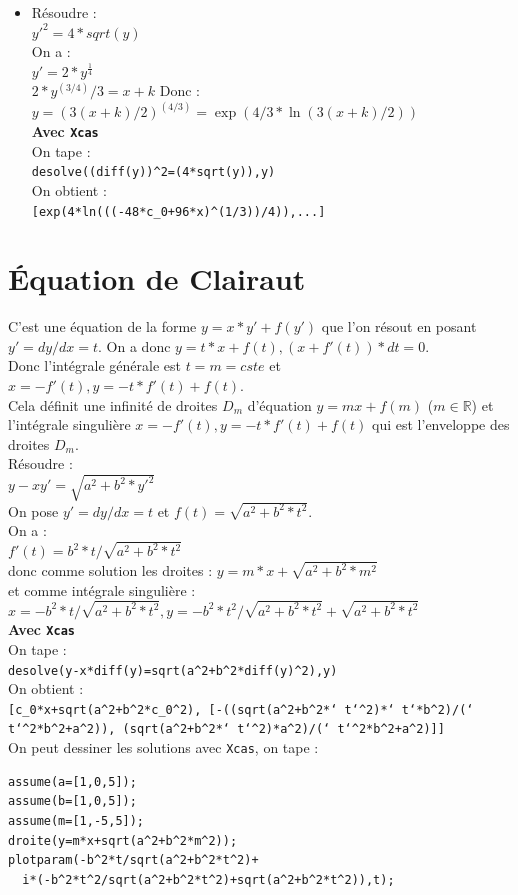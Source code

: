 \documentclass[a4paper,11pt]{book}
\begin{document}
\begin{itemize}
\item R\'esoudre :\\
$y'^2=4*sqrt(y)$\\
On a :\\
$y'=2*y^{\frac{1}{4}}$\\
$2*y^{(3/4)}/3=x+k$
Donc :\\
$y=(3(x+k)/2)^{(4/3)}=\exp(4/3*\ln(3(x+k)/2))$\\
{\bf Avec {\tt Xcas}}\\
On tape :\\
{\tt desolve((diff(y))\verb|^|2=(4*sqrt(y)),y)}\\
On obtient :\\
{\tt [exp(4*ln(((-48*c\_0+96*x)\verb|^|(1/3))/4)),...]}
\end{itemize}

\section{\'Equation de Clairaut} \label{sec:Clairaut}
C'est une \'equation de la forme $y=x*y'+f(y')$ que l'on r\'esout en posant 
$y'=dy/dx=t$. On a donc $y=t*x+f(t),(x+f'(t))*dt=0$.\\
Donc l'int\'egrale g\'en\'erale est $t=m=cste$ et $x=-f'(t),y=-t*f'(t)+f(t)$.\\
Cela  d\'efinit une infinit\'e de droites  $D_m$ d'\'equation $y=mx+f(m)$ 
($m\in \mathbb{R}$) et l'int\'egrale singuli\`ere $x=-f'(t),y=-t*f'(t)+f(t)$
qui est l'enveloppe des droites $D_m$.\\
R\'esoudre :\\
$y-xy'=\sqrt{a^2+b^2*y'^2}$\\
On pose $y'=dy/dx=t$ et $f(t)=\sqrt{a^2+b^2*t^2}$.\\
On a :\\ 
$f'(t)=b^2*t/\sqrt{a^2+b^2*t^2}$ \\
donc comme solution les droites :
$y=m*x+\sqrt{a^2+b^2*m^2}$\\
et comme int\'egrale singuli\`ere :\\
$x=-b^2*t/\sqrt{a^2+b^2*t^2},y=-b^2*t^2/\sqrt{a^2+b^2*t^2}+\sqrt{a^2+b^2*t^2}$\\
{\bf Avec {\tt Xcas}}\\
On tape :\\
{\tt desolve(y-x*diff(y)=sqrt(a\verb|^|2+b\verb|^|2*diff(y)\verb|^|2),y)}\\
On obtient :\\
{\tt[c\_0*x+sqrt(a\verb|^|2+b\verb|^|2*c\_0\verb|^|2),
[-((sqrt(a\verb|^|2+b\verb|^|2*` t`\verb|^|2)*` t`*b\verb|^|2)/(`
t`\verb|^|2*b\verb|^|2+a\verb|^|2)), (sqrt(a\verb|^|2+b\verb|^|2*` t`\verb|^|2)*a\verb|^|2)/(` t`\verb|^|2*b\verb|^|2+a\verb|^|2)]]  }\\
On peut dessiner les solutions avec {\tt Xcas}, on tape :
\begin{verbatim}
assume(a=[1,0,5]);
assume(b=[1,0,5]);
assume(m=[1,-5,5]);
droite(y=m*x+sqrt(a^2+b^2*m^2));
plotparam(-b^2*t/sqrt(a^2+b^2*t^2)+
  i*(-b^2*t^2/sqrt(a^2+b^2*t^2)+sqrt(a^2+b^2*t^2)),t);
\end{verbatim}
\end{document}
